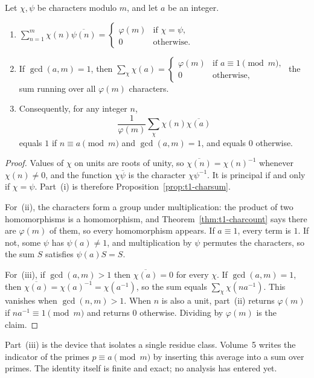 \begin{theorem}[orthogonality]\label{thm:t1-ortho}
Let $\chi,\psi$ be characters modulo $m$, and let $a$ be an integer.
\begin{enumerate}[label=(\roman*)]
\item $\displaystyle\sum_{n=1}^m\chi(n)\overline{\psi(n)}=\begin{cases}\varphi(m)&\text{if }\chi=\psi,\\0&\text{otherwise.}\end{cases}$
\item If $\gcd(a,m)=1$, then $\displaystyle\sum_{\chi}\chi(a)=\begin{cases}\varphi(m)&\text{if }a\equiv1\pmod m,\\0&\text{otherwise,}\end{cases}$ the sum running over all $\varphi(m)$ characters.
\item Consequently, for any integer $n$,
\[
\frac1{\varphi(m)}\sum_{\chi}\chi(n)\overline{\chi(a)}
\]
equals $1$ if $n\equiv a\pmod m$ and $\gcd(a,m)=1$, and equals $0$ otherwise.
\end{enumerate}
\end{theorem}
\begin{proof}
Values of $\chi$ on units are roots of unity, so $\overline{\chi(n)}=\chi(n)^{-1}$ whenever $\chi(n)\ne0$, and the function $\chi\overline{\psi}$ is the character $\chi\psi^{-1}$. It is principal if and only if $\chi=\psi$. Part~(i) is therefore Proposition~\ref{prop:t1-charsum}.

For~(ii), the characters form a group under multiplication: the product of two homomorphisms is a homomorphism, and Theorem~\ref{thm:t1-charcount} says there are $\varphi(m)$ of them, so every homomorphism appears. If $a\equiv1$, every term is $1$. If not, some $\psi$ has $\psi(a)\ne1$, and multiplication by $\psi$ permutes the characters, so the sum $S$ satisfies $\psi(a)S=S$.

For~(iii), if $\gcd(a,m)>1$ then $\overline{\chi(a)}=0$ for every $\chi$. If $\gcd(a,m)=1$, then $\overline{\chi(a)}=\chi(a)^{-1}=\chi(a^{-1})$, so the sum equals $\sum_{\chi}\chi(na^{-1})$. This vanishes when $\gcd(n,m)>1$. When $n$ is also a unit, part~(ii) returns $\varphi(m)$ if $na^{-1}\equiv1\pmod m$ and returns $0$ otherwise. Dividing by $\varphi(m)$ is the claim.
\end{proof}

Part~(iii) is the device that isolates a single residue class. Volume~5 writes the indicator of the primes $p\equiv a\pmod m$ by inserting this average into a sum over primes. The identity itself is finite and exact; no analysis has entered yet.


